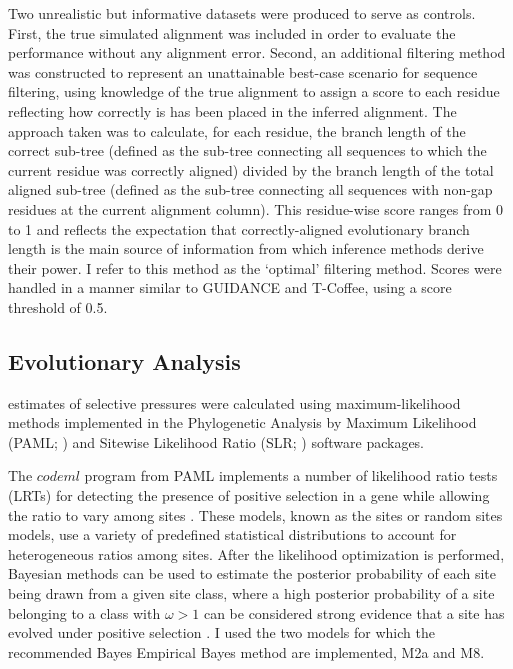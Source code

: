Two unrealistic but informative datasets were produced to serve as controls. First,
the true simulated alignment was included in order to evaluate the \sw
performance without any alignment error. Second, an additional
filtering method was constructed to represent an unattainable
best-case scenario for sequence filtering, using knowledge of the true
alignment to assign a score to each residue reflecting how correctly
is has been placed in the inferred alignment. The approach taken was
to calculate, for each residue, the branch length of the correct
sub-tree (defined as the sub-tree connecting all sequences to which
the current residue was correctly aligned) divided by the branch
length of the total aligned sub-tree (defined as the sub-tree
connecting all sequences with non-gap residues at the current
alignment column). This residue-wise score ranges from 0 to 1 and
reflects the expectation that correctly-aligned evolutionary branch
length is the main source of information from which \sw inference
methods derive their power. I refer to this method as the `optimal'
filtering method. Scores were handled in a manner similar to GUIDANCE and
T-Coffee, using a score threshold of 0.5.

\subsection{\Sw Evolutionary Analysis}

\Sw estimates of selective pressures were calculated using
maximum-likelihood methods implemented in the Phylogenetic Analysis by
Maximum Likelihood (PAML; \citealt{Yang2007PAML}) and Sitewise Likelihood Ratio
(SLR; \citealt{Massingham2005Detecting}) software packages.

The $codeml$ program from PAML implements a number of likelihood ratio
tests (LRTs) for detecting the presence of positive selection in a
gene while allowing the \omg ratio to vary among sites
\citep{Yang2000CodonSubstitution}. These models, known as the sites or
random sites models, use a variety of predefined statistical
distributions to account for heterogeneous \omg ratios among sites. After
the likelihood optimization is performed, Bayesian methods can be used
to estimate the posterior probability of each site being drawn from a
given site class, where a high posterior probability of a site
belonging to a class with $\omega>1$ can be considered strong
evidence that a site has evolved under positive selection
\citep{Yang2005Bayes}. I used the two models for which the
recommended Bayes Empirical Bayes method are implemented, M2a and M8.

